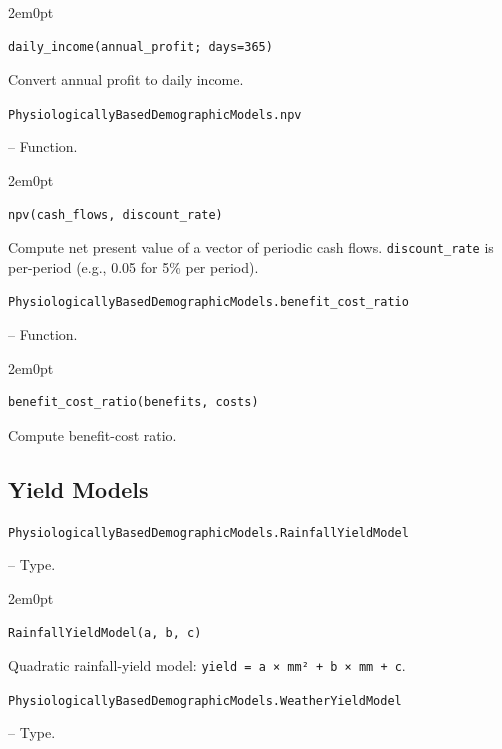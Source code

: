 \begin{adjustwidth}{2em}{0pt}


\begin{verbatim}
daily_income(annual_profit; days=365)
\end{verbatim}

Convert annual profit to daily income.



\end{adjustwidth}
\hypertarget{1149800111366264997}{\texttt{PhysiologicallyBasedDemographicModels.npv}}  -- {Function.}

\begin{adjustwidth}{2em}{0pt}


\begin{verbatim}
npv(cash_flows, discount_rate)
\end{verbatim}

Compute net present value of a vector of periodic cash flows. \texttt{discount\_rate} is per-period (e.g., 0.05 for 5\% per period).



\end{adjustwidth}
\hypertarget{13305920555172290456}{\texttt{PhysiologicallyBasedDemographicModels.benefit\_cost\_ratio}}  -- {Function.}

\begin{adjustwidth}{2em}{0pt}


\begin{verbatim}
benefit_cost_ratio(benefits, costs)
\end{verbatim}

Compute benefit-cost ratio.



\end{adjustwidth}

\subsection{Yield Models}



\label{5271975948387692844}{}

\hypertarget{17454510229143524983}{\texttt{PhysiologicallyBasedDemographicModels.RainfallYieldModel}}  -- {Type.}

\begin{adjustwidth}{2em}{0pt}


\begin{verbatim}
RainfallYieldModel(a, b, c)
\end{verbatim}

Quadratic rainfall-yield model: \texttt{yield = a × mm² + b × mm + c}.



\end{adjustwidth}
\hypertarget{17419238635556062810}{\texttt{PhysiologicallyBasedDemographicModels.WeatherYieldModel}}  -- {Type.}

